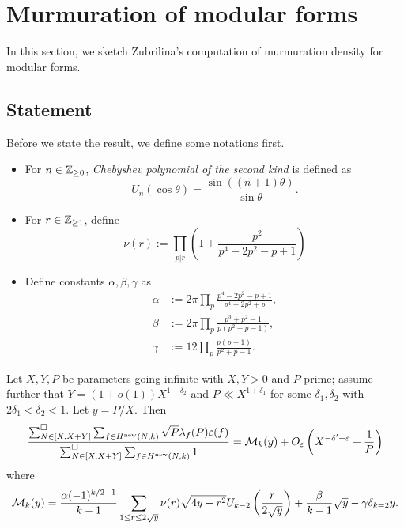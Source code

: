 \section{Murmuration of modular forms}

In this section, we sketch Zubrilina's computation of murmuration density for modular forms.

\subsection{Statement}

Before we state the result, we define some notations first.
\begin{itemize}
    \item For $n \in \mathbb{Z}_{\ge 0}$, \emph{Chebyshev polynomial of the second kind} is defined as
    \[
        U_n(\cos \theta) = \frac{\sin((n+1) \theta)}{\sin\theta}. 
    \]
    \item For $r \in \mathbb{Z}_{\ge 1}$, define
    \[
        \nu(r) := \prod_{p | r} \left(1 + \frac{p^2}{p^4 - 2p^2 - p + 1}\right)
    \]
    \item Define constants $\alpha, \beta, \gamma$ as
    \begin{align*}
        \alpha &:= 2\pi \prod_{p} \frac{p^4 - 2p^2 - p + 1}{p^4 - 2p^2 + p}, \\
        \beta &:= 2\pi \prod_{p} \frac{p^3 + p^2 - 1}{p(p^2 + p - 1)}, \\
        \gamma &:= 12 \prod_{p} \frac{p(p + 1)}{p^2 + p - 1}.
    \end{align*}
\end{itemize}
\begin{theorem}
    \label{thm:zubrilina_modform}
    Let $X, Y, P$ be parameters going infinite with $X, Y > 0$ and $P$ prime; assume further that $Y = (1 + o(1))X^{1 - \delta_2}$ and $P \ll X^{1 + \delta_1}$ for some $\delta_1, \delta_2$ with $2\delta_1 < \delta_2 < 1$.
    Let $y = P/X$. Then
    \begin{equation}
        \label{eqn:zubrilina_modform}
        \frac{\sum_{N \in [X, X + Y]}^\square \sum_{f \in H^{\mathrm{new}}(N, k)} \sqrt{P} \lambda_f(P) \varepsilon(f)}{\sum_{N \in  [X, X + Y]}^\square \sum_{f \in H^{\mathrm{new}}(N, k)} 1} = \mathcal{M}_k(y) + O_\varepsilon \left(X^{-\delta' + \varepsilon} + \frac{1}{P}\right)
    \end{equation}
    where
    \begin{equation}
        \mathcal{M}_k(y) = \frac{\alpha(-1)^{k/2 - 1}}{k - 1} \sum_{1 \le r \le 2\sqrt{y}} \nu(r) \sqrt{4y - r^2} U_{k - 2} \left(\frac{r}{2\sqrt{y}}\right) + \frac{\beta}{k-1} \sqrt{y} - \gamma \delta_{k=2} y.
    \end{equation}
\end{theorem}

